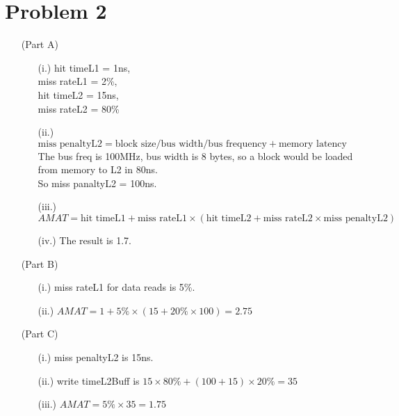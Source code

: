 \documentclass[11pt,leqno]{article}
\begin{document}
\section*{Problem 2}
\begin{enumerate}
\item[(Part A)]

  \begin{enumerate}
    \item[(i.)]
      hit timeL1 = 1ns,\\
      miss rateL1 = 2\%,\\
      hit timeL2 = 15ns,\\
      miss rateL2 = 80\%
    \item[(ii.)]
      $\text{miss penaltyL2} = \text{block size} / \text{bus width} / \text{bus frequency} + \text{memory latency}$\\
      The bus freq is 100MHz, bus width is 8 bytes, so a block would be loaded from memory to L2 in 80ns.\\
      So miss panaltyL2 = 100ns.

    \item[(iii.)]
      $AMAT = \text{hit timeL1} + \text{miss rateL1} \times (\text{hit timeL2} + \text{miss rateL2} \times \text{miss penaltyL2})$
      
    \item[(iv.)]
      The result is 1.7.

  \end{enumerate}

\item[(Part B)]
  \begin{enumerate}
    \item[(i.)]
      miss rateL1 for data reads is 5\%.
    \item[(ii.)]
      $AMAT = 1 + 5\% \times (15 + 20\% \times 100) = 2.75$

  \end{enumerate}
\item[(Part C)]
  \begin{enumerate}
    \item[(i.)]
      miss penaltyL2 is 15ns.

    \item[(ii.)]
      write timeL2Buff is $15 \times 80\% + (100+15) \times 20\% = 35$

    \item[(iii.)]
      $AMAT = 5\% \times 35 = 1.75$

  \end{enumerate}

\end{enumerate}
\end{document}
